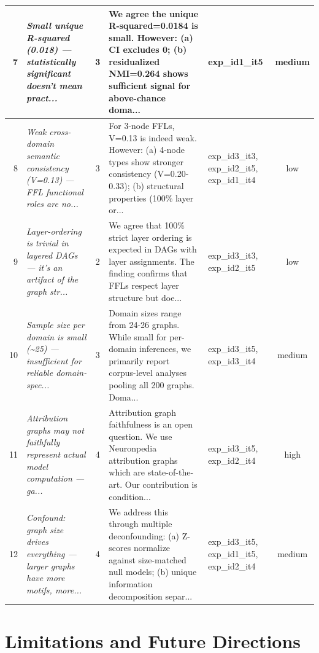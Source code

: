 \documentclass[11pt,a4paper]{article}
\begin{document}
\begin{longtable}{rp{3cm}cp{5.5cm}p{2cm}c}
\midrule
7 & \textit{Small unique R-squared (0.018) — statistically significant doesn't mean pract...} & \cellcolor{orange!20}3 & We agree the unique R-squared=0.0184 is small. However: (a) CI excludes 0; (b) residualized NMI=0.264 shows sufficient signal for above-chance doma... & exp\_id1\_it5 & \cellcolor{orange!20}medium \\
\midrule
8 & \textit{Weak cross-domain semantic consistency (V=0.13) — FFL functional roles are no...} & \cellcolor{orange!20}3 & For 3-node FFLs, V=0.13 is indeed weak. However: (a) 4-node types show stronger consistency (V=0.20-0.33); (b) structural properties (100\% layer or... & exp\_id3\_it3, exp\_id2\_it5, exp\_id1\_it4 & \cellcolor{green!20}low \\
\midrule
9 & \textit{Layer-ordering is trivial in layered DAGs — it's an artifact of the graph str...} & \cellcolor{green!20}2 & We agree that 100\% strict layer ordering is expected in DAGs with layer assignments. The finding confirms that FFLs respect layer structure but doe... & exp\_id3\_it3, exp\_id2\_it5 & \cellcolor{green!20}low \\
\midrule
10 & \textit{Sample size per domain is small (\textasciitilde{}25) — insufficient for reliable domain-spec...} & \cellcolor{orange!20}3 & Domain sizes range from 24-26 graphs. While small for per-domain inferences, we primarily report corpus-level analyses pooling all 200 graphs. Doma... & exp\_id3\_it5, exp\_id3\_it4 & \cellcolor{orange!20}medium \\
\midrule
11 & \textit{Attribution graphs may not faithfully represent actual model computation — ga...} & \cellcolor{red!20}4 & Attribution graph faithfulness is an open question. We use Neuronpedia attribution graphs which are state-of-the-art. Our contribution is condition... & exp\_id3\_it5, exp\_id2\_it4 & \cellcolor{red!20}high \\
\midrule
12 & \textit{Confound: graph size drives everything — larger graphs have more motifs, more...} & \cellcolor{red!20}4 & We address this through multiple deconfounding: (a) Z-scores normalize against size-matched null models; (b) unique information decomposition separ... & exp\_id3\_it5, exp\_id1\_it5, exp\_id2\_it4 & \cellcolor{orange!20}medium \\
\midrule
\end{longtable}
\normalsize


\section{Limitations and Future Directions}
\end{document}
